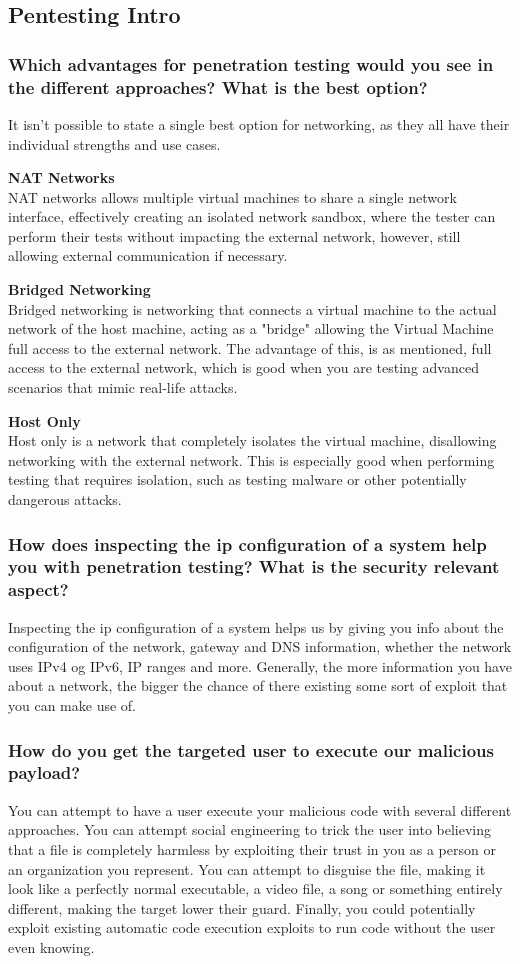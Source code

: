 \subsection{Pentesting Intro}
\subsubsection{Which advantages for penetration testing would you see in the different approaches? What is the best option?}
It isn't possible to state a single best option for networking, as they all have their individual strengths and use cases.

\textbf{NAT Networks}\\
NAT networks allows multiple virtual machines to share a single network interface, effectively creating an isolated network sandbox, where the tester can perform their tests without impacting the external network, however, still allowing external communication if necessary.

\textbf{Bridged Networking}\\
Bridged networking is networking that connects a virtual machine to the actual network of the host machine, acting as a "bridge" allowing the Virtual Machine full access to the external network. The advantage of this, is as mentioned, full access to the external network, which is good when you are testing advanced scenarios that mimic real-life attacks.

\textbf{Host Only}\\
Host only is a network that completely isolates the virtual machine, disallowing networking with the external network. This is especially good when performing testing that requires isolation, such as testing malware or other potentially dangerous attacks.

\subsubsection{How does inspecting the ip configuration of a system help you with penetration testing? What is the security relevant aspect?}
Inspecting the ip configuration of a system helps us by giving you info about the configuration of the network, gateway and DNS information, whether the network uses IPv4 og IPv6, IP ranges and more. Generally, the more information you have about a network, the bigger the chance of there existing some sort of exploit that you can make use of.

\subsubsection{How do you get the targeted user to execute our malicious payload?}
You can attempt to have a user execute your malicious code with several different approaches. You can attempt social engineering to trick the user into believing that a file is completely harmless by exploiting their trust in you as a person or an organization you represent. You can attempt to disguise the file, making it look like a perfectly normal executable, a video file, a song or something entirely different, making the target lower their guard. Finally, you could potentially exploit existing automatic code execution exploits to run code without the user even knowing.

